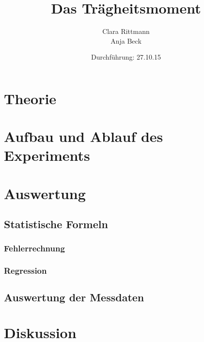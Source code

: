 \documentclass[a4,12pt]{article}
\title{Das Trägheitsmoment}
\author{Clara Rittmann \\ Anja Beck}
\date{Durchführung: 27.10.15}
\begin{document}
	\maketitle
	\date{}
	\tableofcontents

	\section{Theorie}
	

	\section{Aufbau und Ablauf des Experiments}
	



	\section{Auswertung}
	\subsection{Statistische Formeln}
	\subsubsection{Fehlerrechnung}
	
	\subsubsection{Regression}
	
	\subsection{Auswertung der Messdaten}
	

	\section{Diskussion}
	
\end{document}
